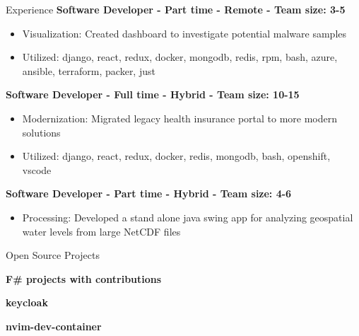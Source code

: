 \documentclass{resume} %
\begin{document}
\begin{rSection}{Experience}
\textbf{Software Developer - Part time - Remote - Team size: 3-5} \\

\begin{itemize}
  \itemsep -2pt {}
      \item Visualization: Created dashboard to investigate potential malware samples
    \item Utilized: django, react, redux, docker, mongodb, redis, rpm, bash, azure, ansible, terraform, packer, just
\end{itemize}

\textbf{Software Developer - Full time - Hybrid - Team size: 10-15} \\

\begin{itemize}
  \itemsep -2pt {}
      \item Modernization: Migrated legacy health insurance portal to more modern solutions
    \item Utilized: django, react, redux, docker, redis, mongodb, bash, openshift, vscode
\end{itemize}

\textbf{Software Developer - Part time - Hybrid - Team size: 4-6} \\

\begin{itemize}
  \itemsep -2pt {}
      \item Processing: Developed a stand alone java swing app for analyzing geospatial water levels from large NetCDF files
\end{itemize}

\end{rSection}


\begin{rSection}{Open Source Projects}
\vspace{-0.90em}
  \item \textbf{F\# projects with contributions} 
  \item \textbf{keycloak} 
  \item \textbf{nvim-dev-container} 
\end{rSection}
\end{document}
